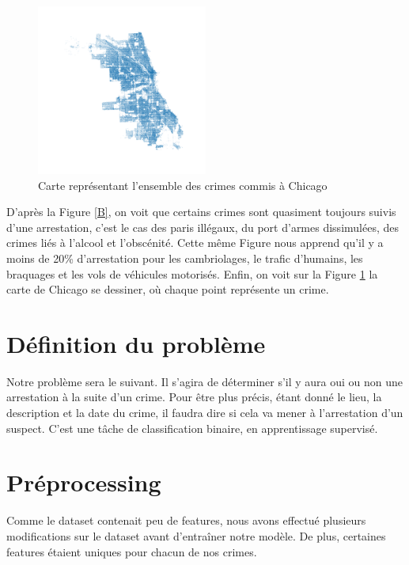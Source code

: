 \documentclass{article}
\begin{document}
    \begin{figure}
	    \centering
	    \includegraphics[width=0.5\textwidth]{images/carte_chicago.png}
	    \caption{Carte représentant l'ensemble des crimes commis à Chicago}
	    \label{C}
    \end{figure}

    D'après la Figure \ref{B}, on voit que certains crimes sont quasiment toujours suivis 
    d'une arrestation, c'est le cas des paris illégaux, du port d'armes dissimulées, 
    des crimes liés à l'alcool et l'obscénité.
    Cette même Figure nous apprend qu'il y a moins de 20\% d'arrestation pour les 
    cambriolages, le trafic d'humains, les braquages et les vols de véhicules motorisés.
    Enfin, on voit sur la Figure \ref{C} la carte de Chicago se dessiner, où chaque
    point représente un crime.

    \section{Définition du problème}
    Notre problème sera le suivant. Il s'agira de déterminer s'il y aura
    oui ou non une arrestation à la suite d'un crime. 
    Pour être plus précis, étant donné le lieu, la description et la date du crime, 
    il faudra dire si cela va mener à l'arrestation d'un suspect.
    C'est une tâche de classification
    binaire, en apprentissage supervisé.

    \section{Préprocessing}
    Comme le dataset contenait peu de features, 
    nous avons effectué plusieurs modifications sur le dataset 
    avant d'entraîner notre modèle.
    De plus, certaines features étaient uniques pour chacun de nos crimes.
\end{document}
